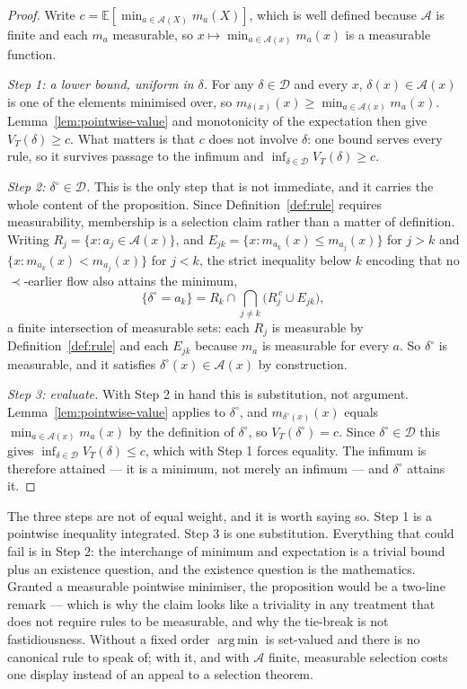 \documentclass[11pt,a4paper]{article}
\theoremstyle{plain}
\theoremstyle{definition}
\theoremstyle{remark}
\DeclareMathOperator*{\argmin}{arg\,min}
\newcommand{\E}{\mathbb E}
\begin{document}
\begin{proof}
Write $c=\E[\min_{a\in\mathcal A(X)}m_a(X)]$, which is well defined because $\mathcal A$ is finite
and each $m_a$ measurable, so $x\mapsto\min_{a\in\mathcal A(x)}m_a(x)$ is a measurable function.

\emph{Step 1: a lower bound, uniform in $\delta$.} For any $\delta\in\mathcal D$ and every $x$,
$\delta(x)\in\mathcal A(x)$ is one of the elements minimised over, so
$m_{\delta(x)}(x)\ge\min_{a\in\mathcal A(x)}m_a(x)$. Lemma~\ref{lem:pointwise-value} and
monotonicity of the expectation then give $V_T(\delta)\ge c$. What matters is that $c$ does not
involve $\delta$: one bound serves every rule, so it survives passage to the infimum and
$\inf_{\delta\in\mathcal D}V_T(\delta)\ge c$.

\emph{Step 2: $\delta^\circ\in\mathcal D$.} This is the only step that is not immediate, and it
carries the whole content of the proposition. Since Definition~\ref{def:rule} requires
measurability, membership is a selection claim rather than a matter of definition. Writing
$R_j=\{x:a_j\in\mathcal A(x)\}$, and $E_{jk}=\{x:m_{a_k}(x)\le m_{a_j}(x)\}$ for $j>k$ and
$\{x:m_{a_k}(x)<m_{a_j}(x)\}$ for $j<k$, the strict inequality below $k$ encoding that no
$\prec$-earlier flow also attains the minimum,
\[
\{\delta^\circ=a_k\}=R_k\cap\bigcap_{j\ne k}\bigl(R_j^{\,c}\cup E_{jk}\bigr),
\]
a finite intersection of measurable sets: each $R_j$ is measurable by Definition~\ref{def:rule}
and each $E_{jk}$ because $m_a$ is measurable for every $a$. So $\delta^\circ$ is measurable, and
it satisfies $\delta^\circ(x)\in\mathcal A(x)$ by construction.

\emph{Step 3: evaluate.} With Step 2 in hand this is substitution, not argument.
Lemma~\ref{lem:pointwise-value} applies to $\delta^\circ$, and $m_{\delta^\circ(x)}(x)$ equals
$\min_{a\in\mathcal A(x)}m_a(x)$ by the definition of $\delta^\circ$, so $V_T(\delta^\circ)=c$.
Since $\delta^\circ\in\mathcal D$ this gives $\inf_{\delta\in\mathcal D}V_T(\delta)\le c$, which
with Step 1 forces equality. The infimum is therefore attained --- it is a minimum, not merely an
infimum --- and $\delta^\circ$ attains it.
\end{proof}

The three steps are not of equal weight, and it is worth saying so. Step 1 is a pointwise
inequality integrated. Step 3 is one substitution. Everything that could fail is in Step 2: the
interchange of minimum and expectation is a trivial bound plus an existence question, and the
existence question is the mathematics. Granted a measurable pointwise minimiser, the proposition
would be a two-line remark --- which is why the claim looks like a triviality in any treatment
that does not require rules to be measurable, and why the tie-break is not fastidiousness.
Without a fixed order $\argmin$ is set-valued and there is no canonical rule to speak of; with it,
and with $\mathcal A$ finite, measurable selection costs one display instead of an appeal to a
selection theorem.
\end{document}
